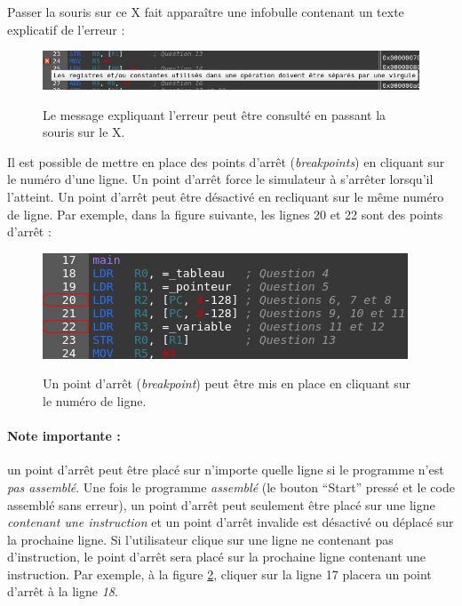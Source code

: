 \documentclass{tufte-handout}
\begin{document}
Passer la souris sur ce X fait apparaître une infobulle contenant un texte explicatif de l'erreur :
\begin{figure}[h!]
\raggedleft
\includegraphics[width=\linewidth]{pics/editeur_err_bulle.png}
\label{f:editeurerrorplus}
\caption{Le message expliquant l'erreur peut être consulté en passant la souris sur le X.}
\end{figure}


Il est possible de mettre en place des points d'arrêt (\textit{breakpoints}) en cliquant sur le numéro d'une ligne. Un point d'arrêt force le simulateur à s'arrêter lorsqu'il l'atteint. Un point d'arrêt peut être désactivé en recliquant sur le même numéro de ligne. Par exemple, dans la figure suivante, les lignes 20 et 22 sont des points d'arrêt :
\begin{figure}[h!]
\raggedleft
\includegraphics[width=0.9\linewidth]{pics/editeur_bkpt.png}
\label{f:editeurbkpt}
\caption{Un point d'arrêt (\textit{breakpoint}) peut être mis en place en cliquant sur le numéro de ligne.}
\end{figure}

\paragraph{\textbf{Note importante :}}un point d'arrêt peut être placé sur n'importe quelle ligne si le programme n'est \emph{pas assemblé}. Une fois le programme \emph{assemblé} (le bouton ``Start'' pressé et le code assemblé sans erreur), un point d'arrêt peut seulement être placé sur une ligne \emph{contenant une instruction} et un point d'arrêt invalide est désactivé ou déplacé sur la prochaine ligne. Si l'utilisateur clique sur une ligne ne contenant pas d'instruction, le point d'arrêt sera placé sur la prochaine ligne contenant une instruction. Par exemple, à la figure \ref{f:editeurbkpt}, cliquer sur la ligne 17 placera un point d'arrêt à la ligne \emph{18}.
\end{document}
